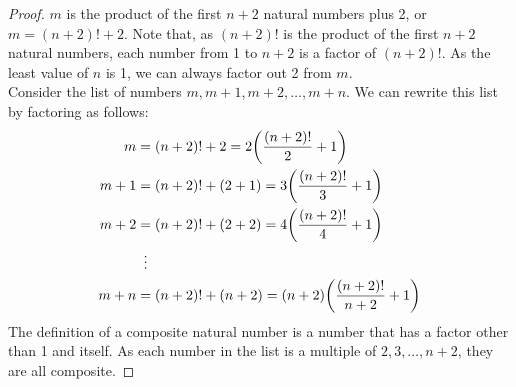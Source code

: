 \documentclass[article, 12pt]{article}
\theoremstyle{definition}
\DeclarePairedDelimiter\paren{(}{)} %
\begin{document}
    \begin{proof}
        $m$ is the product of the first $n+2$ natural numbers plus 2, or $m = (n+2)! + 2$. Note that, as $(n+2)!$ is the product of the first $n+2$ natural numbers, each number from 1 to $n+2$ is a factor of $(n+2)!$. As the least value of $n$ is 1, we can always factor out 2 from $m$.
        \\[12pt]
        Consider the list of numbers $m, m+1, m+2, \dots, m+n$. We can rewrite this list by factoring as follows:
        \begin{align*}
            m &= (n+2)! + 2 = 2\paren*{\frac{(n+2)!}{2} + 1} \\
            m+1 &= (n+2)! + (2+1) = 3\paren*{\frac{(n+2)!}{3} + 1} \\
            m+2 &= (n+2)! + (2+2) = 4\paren*{\frac{(n+2)!}{4} + 1} \\
            &\vdotswithin{=} \\
            m+n &= (n+2)! + (n+2) = (n+2)\paren*{\frac{(n+2)!}{n+2} + 1}
        \end{align*}
        The definition of a composite natural number is a number that has a factor other than 1 and itself. As each number in the list is a multiple of $2,3,\dots, n+2$, they are all composite. 
    \end{proof}
\end{document}
